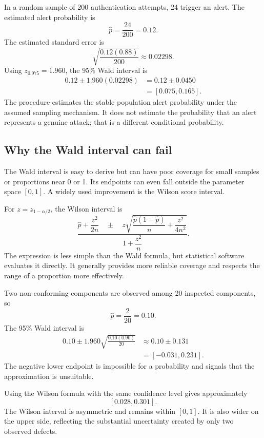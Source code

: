 \begin{example}\par
In a random sample of 200 authentication attempts, 24 trigger an alert. The estimated alert probability is
\[
    \widehat p=\frac{24}{200}=0.12.
\]
The estimated standard error is
\[
    \sqrt{\frac{0.12(0.88)}{200}}
      \approx0.02298.
\]
Using $z_{0.975}=1.960$, the 95\% Wald interval is
\[
\begin{aligned}
    0.12\pm1.960(0.02298)
      &=0.12\pm0.0450\\
      &=[0.075,0.165].
\end{aligned}
\]
The procedure estimates the stable population alert probability under the assumed sampling mechanism. It does not estimate the probability that an alert represents a genuine attack; that is a different conditional probability.
\end{example}

\subsection{Why the Wald interval can fail}

The Wald interval is easy to derive but can have poor coverage for small samples or proportions near 0 or 1. Its endpoints can even fall outside the parameter space $[0,1]$. A widely used improvement is the Wilson score interval.

For $z=z_{1-\alpha/2}$, the Wilson interval is
\[
\frac{
  \widehat p+\dfrac{z^2}{2n}
  \quad\pm\quad
  z\sqrt{
    \dfrac{\widehat p(1-\widehat p)}{n}
    +\dfrac{z^2}{4n^2}
  }
}{
  1+\dfrac{z^2}{n}
}.
\]
The expression is less simple than the Wald formula, but statistical software evaluates it directly. It generally provides more reliable coverage and respects the range of a proportion more effectively.

\begin{example}\par
Two non-conforming components are observed among 20 inspected components, so
\[
    \widehat p=\frac{2}{20}=0.10.
\]
The 95\% Wald interval is
\[
\begin{aligned}
    0.10
      \pm1.960\sqrt{\frac{0.10(0.90)}{20}}
      &\approx0.10\pm0.131\\
      &=[-0.031,0.231].
\end{aligned}
\]
The negative lower endpoint is impossible for a probability and signals that the approximation is unsuitable.

Using the Wilson formula with the same confidence level gives approximately
\[
    [0.028,0.301].
\]
The Wilson interval is asymmetric and remains within $[0,1]$. It is also wider on the upper side, reflecting the substantial uncertainty created by only two observed defects.
\end{example}

